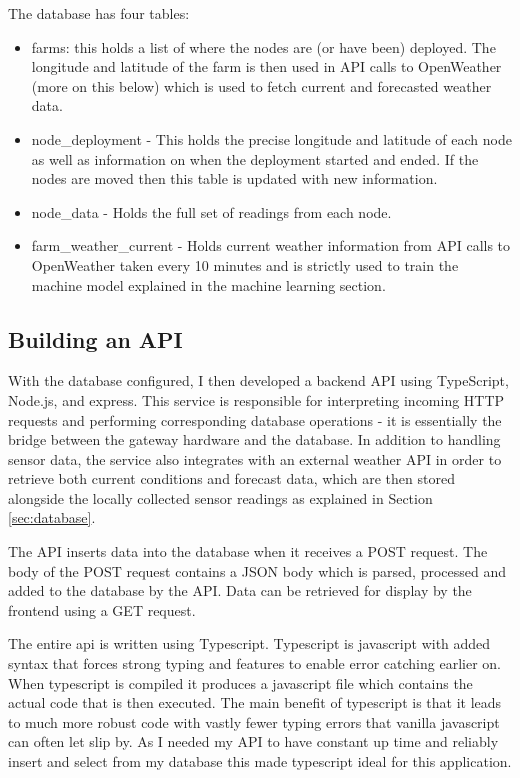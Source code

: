 The database has four tables:

\begin{itemize}     
      \item farms: this holds a list of where the nodes are (or have been)
      deployed. The longitude and latitude of the farm is then used in API calls
      to OpenWeather (more on this below) which is used to fetch current and
      forecasted weather data.
      \item node\_deployment - This holds the precise longitude and latitude of
      each node as well as information on when the deployment started and ended.
      If the nodes are moved then this table is updated with new information.     
      \item node\_data - Holds the full set of readings from each node.    
      \item farm\_weather\_current - Holds current weather information from API
      calls to OpenWeather taken every 10 minutes and is strictly used to train
      the machine model explained in the machine learning section.
 \end{itemize} 


\subsection{Building an API}

With the database configured, I then developed a backend API using TypeScript,
Node.js, and express. This service is responsible for interpreting incoming HTTP
requests and performing corresponding database operations - it is essentially
the bridge between the gateway hardware and the database. In addition to
handling sensor data, the service also integrates with an external weather API
in order to retrieve both current conditions and forecast data, which are then
stored alongside the locally collected sensor readings as explained in Section
\ref{sec:database}.

The API inserts data into the database when it receives a POST request. The body
of the POST request contains a JSON body which is parsed, processed and added to
the database by the API. Data can be retrieved for display by the frontend using
a GET request.

The entire api is written using Typescript. Typescript is javascript with added
syntax that forces strong typing and features to enable error catching earlier
on. When typescript is compiled it produces a javascript file which contains the
actual code that is then executed. The main benefit of typescript is that it
leads to much more robust code with vastly fewer typing errors that vanilla
javascript can often let slip by. As I needed my API to have constant up time
and reliably insert and select from my database this made typescript ideal for
this application.


